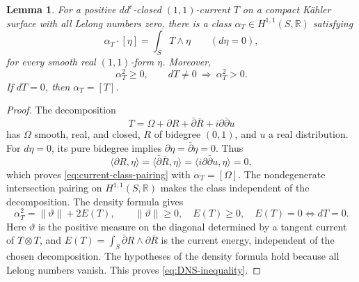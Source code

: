 \documentclass[11pt]{amsart}
\newtheorem{lemma}[theorem]{Lemma}
\theoremstyle{definition}
\theoremstyle{remark}
\numberwithin{equation}{section}
\newcommand{\R}{\mathbb R}
\newcommand{\ddc}{dd^c}
\newcommand{\barp}{\bar\partial}
\begin{document}
\begin{lemma}\label{lem:surface-current-inequality}
For a positive $\ddc$-closed $(1,1)$-current $T$ on a compact
K\"ahler surface with all Lelong numbers zero, there is a class
$\alpha_T\in H^{1,1}(S,\R)$ satisfying
\begin{equation}\label{eq:current-class-pairing}
 \alpha_T\cdot[\eta]=\int_S T\wedge\eta
 \qquad(d\eta=0),
\end{equation}
for every smooth real $(1,1)$-form $\eta$. Moreover,
\begin{equation}\label{eq:DNS-inequality}
 \alpha_T^2\ge0,\qquad dT\ne0\ \Longrightarrow\ \alpha_T^2>0.
\end{equation}
If $dT=0$, then $\alpha_T=[T]$.
\end{lemma}
\begin{proof}
The decomposition \cite[\S2.1 and Lemma~B.2]{DNS22}
\[
 T=\Omega+\partial R+\barp\overline R
                  +i\partial\barp u
\]
has $\Omega$ smooth, real, and closed, $R$ of bidegree $(0,1)$,
and $u$ a real distribution. For $d\eta=0$, its pure bidegree
implies $\partial\eta=\barp\eta=0$. Thus
\[
 \langle\partial R,\eta\rangle
 =\langle\barp\overline R,\eta\rangle
 =\langle i\partial\barp u,\eta\rangle=0,
\]
which proves \eqref{eq:current-class-pairing} with
$\alpha_T=[\Omega]$. The nondegenerate intersection pairing on
$H^{1,1}(S,\R)$ makes the class independent of the decomposition.
The density formula \cite[Theorem~2.2(2), Corollary~2.4]{DNS22} gives
\[
 \alpha_T^2=\|\vartheta\|+2E(T),\qquad
 \|\vartheta\|\ge0,\quad E(T)\ge0,
 \quad E(T)=0\Longleftrightarrow dT=0.
\]
Here $\vartheta$ is the positive measure on the diagonal determined
by a tangent current of $T\otimes T$, and
$E(T)=\int_S\barp R\wedge\partial\overline R$ is the
current energy, independent of the chosen decomposition.
The hypotheses of the density formula hold because all Lelong numbers vanish. This
proves \eqref{eq:DNS-inequality}.
\end{proof}
\end{document}
